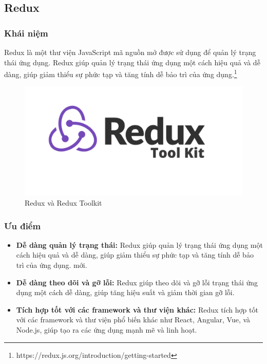 \subsection{Redux}
\subsubsection{Khái niệm}
\noindent Redux là một thư viện JavaScript mã nguồn mở được sử dụng để quản lý trạng thái ứng dụng. Redux giúp quản lý trạng thái ứng dụng một cách hiệu quả và dễ dàng, giúp giảm thiểu sự phức tạp và tăng tính dễ bảo trì của ứng dụng.\footnote{https://redux.js.org/introduction/getting-started}
\begin{figure}[H]
  \begin{center}
    \includegraphics[scale=0.3]{images/hieu/phuluc/redux.png}
    \caption{Redux và Redux Toolkit}
  \end{center}
\end{figure}
\subsubsection{Ưu điểm}
\begin{itemize}
  \item \textbf{Dễ dàng quản lý trạng thái:} Redux giúp quản lý trạng thái ứng dụng một cách hiệu quả và dễ dàng, giúp giảm thiểu sự phức tạp và tăng tính dễ bảo trì của ứng dụng.
  mới.
  \item \textbf{Dễ dàng theo dõi và gỡ lỗi:} Redux giúp theo dõi và gỡ lỗi trạng thái ứng dụng một cách dễ dàng, giúp tăng hiệu suất và giảm thời gian gỡ lỗi.
  \item \textbf{Tích hợp tốt với các framework và thư viện khác:} Redux tích hợp tốt với các framework và thư viện phổ biến khác như React, Angular, Vue, và Node.js, giúp tạo ra các ứng dụng mạnh mẽ và linh hoạt.  
\end{itemize}
